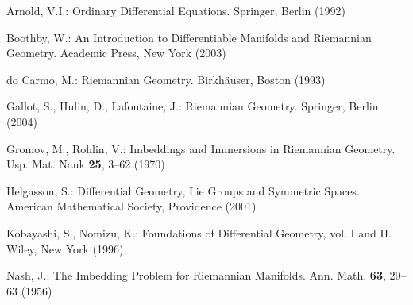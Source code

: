 \RGReferenceSection

\begin{description}[style=multiline,leftmargin=5em,labelwidth=4.5em,font=\normalfont]
\item[{[Arn92]}]Arnold, V.I.: Ordinary Differential Equations. Springer, Berlin (1992)
\item[{[Boo03]}]Boothby, W.: An Introduction to Differentiable Manifolds and Riemannian Geometry. Academic Press, New York (2003)
\item[{[dC93]}]do Carmo, M.: Riemannian Geometry. Birkhäuser, Boston (1993)
\item[{[GHL04]}]Gallot, S., Hulin, D., Lafontaine, J.: Riemannian Geometry. Springer, Berlin (2004)
\item[{[GR70]}]Gromov, M., Rohlin, V.: Imbeddings and Immersions in Riemannian Geometry. Usp. Mat. Nauk \textbf{25}, 3–62 (1970)
\item[{[Hel01]}]Helgasson, S.: Differential Geometry, Lie Groups and Symmetric Spaces. American Mathematical Society, Providence (2001)
\item[{[KN96]}]Kobayashi, S., Nomizu, K.: Foundations of Differential Geometry, vol. I and II. Wiley, New York (1996)
\item[{[Nas56]}]Nash, J.: The Imbedding Problem for Riemannian Manifolds. Ann. Math. \textbf{63}, 20–63 (1956)
\end{description}
